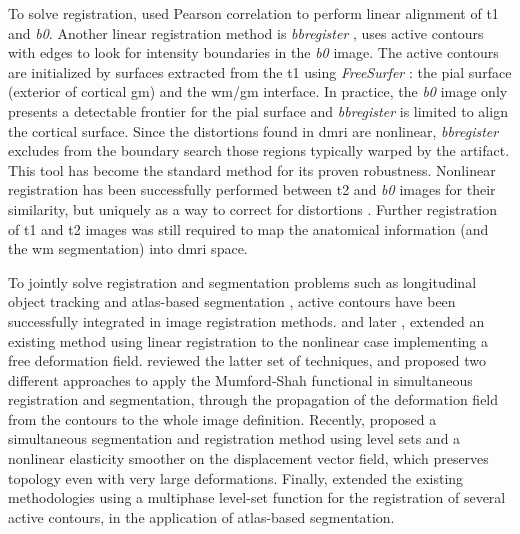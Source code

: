 To solve registration, \cite{saad_new_2009} used Pearson correlation to perform linear
  alignment of \gls*{t1} and \emph{b0}.
Another linear registration method is \emph{bbregister} \citep{greve_accurate_2009},
  uses active contours with edges to look for intensity boundaries in the \emph{b0}
  image.
The active contours are initialized by surfaces extracted from the 
  \gls*{t1} using \emph{FreeSurfer} \citep{fischl_freesurfer_2012}:
  the pial surface (exterior of cortical \gls*{gm}) and the \gls*{wm}/\gls*{gm} interface.
In practice, the \emph{b0} image only presents a detectable frontier for the pial surface
  and \emph{bbregister} is limited to align the cortical surface.
Since the distortions found in \gls*{dmri} are nonlinear, \emph{bbregister} excludes
  from the boundary search those regions typically warped by the artifact.
This tool has become the standard method for its proven robustness.
Nonlinear registration has been successfully performed between \gls*{t2} and \emph{b0}
  images for their similarity, but uniquely as a way to correct for distortions
  \citep{kybic_unwarping_2000,studholme_accurate_2000,wu_comparison_2008,tao_variational_2009}.
Further registration of \gls*{t1} and \gls*{t2} images was still required to map the anatomical
  information (and the \gls*{wm} segmentation) into \gls*{dmri} space.


To jointly solve registration and segmentation problems such as longitudinal object
  tracking \citep{paragios_level_2003} and atlas-based segmentation 
  \citep{gorthi_active_2011}, active contours have been successfully integrated 
  in image registration methods.
\cite{unal_coupled_2005} and later \cite{wang_joint_2006},
  extended an existing method using linear registration \citep{yezzi_variational_2003}
  to the nonlinear case implementing a free deformation field.
\cite{droske_mumfordshah_2009} reviewed the latter set of techniques, and proposed two different
  approaches to apply the Mumford-Shah functional \citep{mumford_optimal_1989} in simultaneous
  registration and segmentation, through the propagation of the deformation field from
  the contours to the whole image definition.
Recently, \cite{guyader_combined_2011} proposed a simultaneous segmentation and
  registration method using level sets and a nonlinear elasticity smoother on the
  displacement vector field, which preserves topology even with very large deformations.
Finally, \cite{gorthi_active_2011} extended the existing methodologies using a multiphase
  level-set function for the registration of several active contours, in the application
  of atlas-based segmentation.
  
